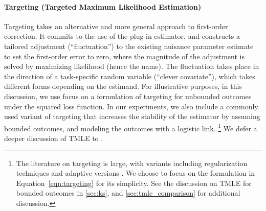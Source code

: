 \paragraph{Targeting (Targeted Maximum Likelihood Estimation)~\cite{VanDerLaanRo11,van2006targeted}} 
Targeting takes an alternative and more general approach to first-order correction. It commits to the use of the plug-in estimator, and constructs a tailored adjustment (``fluctuation'') to the existing 
nuisance parameter estimate %
to set the 
first-order error to zero, where the magnitude of the adjustment is solved by maximizing likelihood (hence the name). The fluctuation takes place in the 
direction of a task-specific random variable (``clever covariate''),  which takes 
different forms depending on the estimand. For illustrative purposes, in this discussion, we use focus on a formulation of targeting for unbounded outcomes under the squared loss function. %
In our experiments, we also include a commonly used variant of targeting that increases the stability of the estimator by assuming bounded outcomes, and modeling the outcomes with a logistic link.
\footnote{The literature on targeting is large, with variants including regularization techniques and adaptive versions \citep{VanDerLaanRo11,van2011cross,van2006targeted,van2024adaptive}. 
We choose to focus on the formulation in Equation~\eqref{eqn:targeting} for its simplicity. See %
the discussion on TMLE for bounded outcomes in \cref{sec:ks}, and \cref{sec:tmle_comparison} for additional discussion.
}
We defer a deeper discussion of TMLE to .

